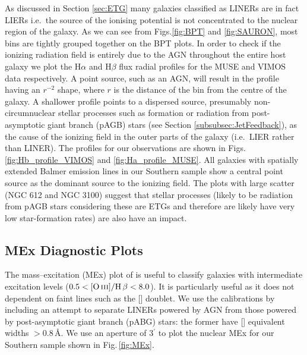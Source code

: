 		As discussed in Section \ref{sec:ETG} many galaxies classified as LINERs are in fact LIERs \citep[e.g.][]{Sarzi2005, Sarzi2010, Singh2013, Belfiore2016} i.e.\ the source of the ionising potential is not concentrated to the nuclear region of the galaxy. As we can see from Figs.\ref{fig:BPT} and \ref{fig:SAURON}, most bins are tightly grouped together on the BPT plots. In order to check if the ionizing radiation field is entirely due to the AGN throughout the entire host galaxy we plot the H$\alpha$ and H$\beta$ flux radial profiles for the MUSE and VIMOS data respectively. A point source, such as an AGN, will result in the profile having an $r^{-2}$ shape, where $r$ is the distance of the bin from the centre of the galaxy. A shallower profile points to a dispersed source, presumably non-circumnuclear stellar processes such as formation or radiation from post-asymptotic giant branch (pAGB) stars (see Section \ref{subsubsec:JetFeedback}), as the cause of the ionizing field in the outer parts of the galaxy (i.e.\ LIER rather than LINER). The profiles for our observations are shown in Figs.\,\ref{fig:Hb_profile_VIMOS} and \ref{fig:Ha_profile_MUSE}. All galaxies with spatially extended Balmer emission lines in our Southern sample show a central point source as the dominant source to the ionizing field. The plots with large scatter (NGC 612 and NGC 3100) suggest that stellar processes (likely to be radiation from pAGB stars considering these are ETGs and therefore are likely have very low star-formation rates) are also have an impact.

		


	\subsection{MEx Diagnostic Plots}
		\label{subsec:MEx}
		The mass--excitation (MEx) plot of \citet{Juneau2011} is useful to classify galaxies with intermediate excitation levels ($0.5 < \mathrm{[\ion{O}{iii}]/H\,\beta} < 8.0$). It is particularly useful as it does not dependent on faint lines such as the [] doublet. We use the calibrations by \citet{Nyland2016} including an attempt to separate LINERs powered by AGN from those powered by post-asymptotic giant branch (pABG) stars: the former have [] equivalent widths $>0.8$\,\AA. We use an aperture of 3$^\prime$ to plot the nuclear MEx for our Southern sample shown in Fig.\,\ref{fig:MEx}. 


